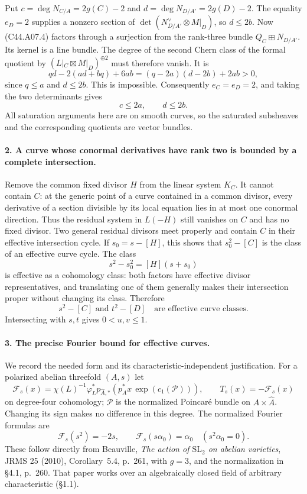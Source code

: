 \documentclass[11pt]{article}
\theoremstyle{remark}\newtheorem{remark}[theorem]{Remark}
\begin{document}
Put $c=\deg N_{C/A}=2g(C)-2$ and
$d=\deg N_{D/A'}=2g(D)-2$. The equality $e_D=2$ supplies a nonzero
section of $\det(N_{D/A'}^{\vee}\otimes M|_D)$, so $d\le2b$.
Now (C44.A07.4) factors through a surjection from the rank-three
bundle $Q_C\boxplus N_{D/A'}$. Its kernel is a line bundle. The
degree of the second Chern class of the formal quotient by
$(L|_C\boxtimes M|_D)^{\oplus2}$ must therefore vanish. It is
\[
 qd-2(ad+bq)+6ab=(q-2a)(d-2b)+2ab>0,
\]
since $q\le a$ and $d\le2b$. This is impossible. Consequently
$e_C=e_D=2$, and taking the two determinants gives
\[
 c\le2a,\qquad d\le2b.
 \tag{C44.A07.5}
\]
All saturation arguments here are on smooth curves, so the saturated
subsheaves and the corresponding quotients are vector bundles.

\paragraph{2. A curve whose conormal derivatives have rank two is bounded by a complete intersection.}
Remove the common fixed divisor $H$ from the linear system $K_C$.
It cannot contain $C$: at the generic point of a curve contained
in a common divisor, every derivative of a section divisible by its
local equation lies in at most one conormal direction. Thus the
residual system in $L(-H)$ still vanishes on $C$ and has no fixed
divisor. Two general residual divisors meet properly and contain
$C$ in their effective intersection cycle. If $s_0=s-[H]$, this
shows that $s_0^2-[C]$ is the class of an effective curve cycle.
The class
\[
 s^2-s_0^2=[H](s+s_0)
\]
is effective as a cohomology class: both factors have effective
divisor representatives, and translating one of them generally
makes their intersection proper without changing its class.
Therefore
\[
 s^2-[C]\text{ and }t^2-[D]
 \quad\text{are effective curve classes.}
 \tag{C44.A07.6}
\]
Intersecting with $s,t$ gives $0<u,v\le1$.

\paragraph{3. The precise Fourier bound for effective curves.}
We record the needed form and its characteristic-independent
justification. For a polarized abelian threefold $(A,s)$ let
\[
 \mathcal F_s(x)=\chi(L)^{-1}\varphi_L^*
       p_{\widehat A,*}(p_A^*x\,\exp(c_1(\mathcal P))),
 \qquad T_s(x)=-\mathcal F_s(x)
\]
on degree-four cohomology; $\mathcal P$ is the normalized Poincar\'e
bundle on $A\times\widehat A$. Changing its sign makes no difference
in this degree. The normalized Fourier formulas are
\[
 \mathcal F_s(s^2)=-2s,\qquad
 \mathcal F_s(s\alpha_0)=\alpha_0\quad(s^2\alpha_0=0).
 \tag{C44.A07.7}
\]
These follow directly from Beauville, \emph{The action of
$\mathrm{SL}_2$ on abelian varieties}, JRMS 25 (2010),
Corollary~5.4, p.~261, with $g=3$, and the normalization in
\S4.1, p.~260. That paper works over an algebraically closed field
of arbitrary characteristic (\S1.1).
\end{document}
